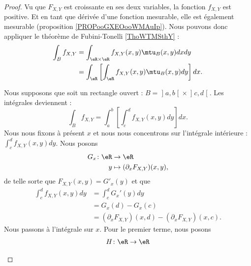 \begin{proof}
	Vu que \( F_{X,Y}\) est croissante en ses deux variables, la fonction \( f_{X,Y}\) est positive. Et en tant que dérivée d'une fonction mesurable, elle est également mesurable (proposition \ref{PROPooGXEOooWMAuIp}). Nous pouvons donc appliquer le théorème de Fubini-Tonelli \ref{ThoWTMSthY} :
	\begin{subequations}
		\begin{align}
			\int_Bf_{X,Y} & =\int_{\eR\times \eR}f_{X,Y}(x,y)\mtu_B(x,y)dxdy                   \\
			              & =\int_{\eR}\left[  \int_{\eR}f_{X,Y}(x,y)\mtu_B(x,y)dy  \right]dx.
		\end{align}
	\end{subequations}
	\begin{subproof}
		Nous supposons que soit un rectangle ouvert :  \( B=\mathopen] a,b\mathclose[\times \mathopen] c,d\mathclose[\). Les intégrales deviennent :
		\begin{equation}
			\int_Bf_{X,Y}=\int_a^b\left[\int_c^df_{X,Y}(x,y)dy\right]dx.
		\end{equation}
		Nous nous fixons à présent \( x\) et nous nous concentrons sur l'intégrale intérieure  : \( \int_c^df_{X,Y}(x,y)dy\). Nous posons
		\begin{equation}
			\begin{aligned}
				G_x\colon \eR & \to \eR                           \\
				y             & \mapsto (\partial_xF_{X,Y})(x,y),
			\end{aligned}
		\end{equation}
		de telle sorte que \( F_{X,Y}(x,y)=G'_x(y)\) et que
		\begin{subequations}
			\begin{align}
				\int_c^df_{X,Y}(x,y)dy & =\int_c^dG_x'(y)dy                                  \\
				                       & =G_x(d)-G_x(c)                                      \\
				                       & =(\partial_xF_{X,Y})(x,d)-(\partial_xF_{X,Y})(x,c).
			\end{align}
		\end{subequations}
		Nous passons à l'intégrale sur \( x\). Pour le premier terme, nous posons
		\begin{equation}
			\begin{aligned}
				H\colon \eR & \to \eR         \\

\end{aligned}
\end{equation}
\end{subproof}
\end{proof}

